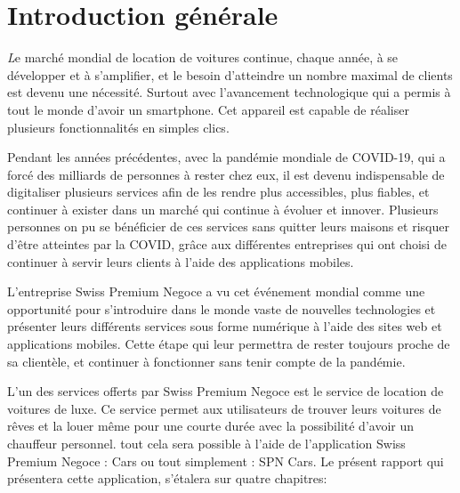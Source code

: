 \thispagestyle{plain}
\setcounter{page}{1}
\chapter*{Introduction générale}
\vspace{1cm}
\setlength{\parindent}{40pt}
\justifying
\begin{small}
    \lettrine[findent=2pt,lines=3]{\textit{L}}{}e marché mondial de location de voitures continue, chaque année, à se développer et à s'amplifier, et le besoin d'atteindre un nombre maximal de clients est devenu une nécessité. Surtout avec l'avancement technologique qui a permis à tout le monde d'avoir un smartphone. Cet appareil est capable de réaliser plusieurs fonctionnalités en simples clics.

    \noindent Pendant les années précédentes, avec la pandémie mondiale de COVID-19, qui a forcé des milliards de personnes à rester chez eux, il est devenu indispensable de digitaliser plusieurs services afin de les rendre plus accessibles, plus fiables, et continuer à exister dans un marché qui continue à évoluer et innover. Plusieurs personnes on pu se bénéficier de ces services sans quitter leurs maisons et risquer d'être atteintes par la COVID, grâce aux différentes entreprises qui ont choisi de continuer à servir leurs clients à l'aide des applications mobiles.

    \noindent L'entreprise Swiss Premium Negoce a vu cet événement mondial comme une opportunité pour s'introduire dans le monde vaste de nouvelles technologies et présenter leurs différents services sous forme numérique à l'aide des sites web et applications mobiles. Cette étape qui leur permettra de rester toujours proche de sa clientèle, et continuer à fonctionner sans tenir compte de la pandémie.

    \noindent L'un des services offerts par Swiss Premium Negoce est le service de location de voitures de luxe. Ce service permet aux utilisateurs de trouver leurs voitures de rêves et la louer même pour une courte durée avec la possibilité d'avoir un chauffeur personnel. tout cela sera possible à l'aide de l'application Swiss Premium Negoce : Cars ou tout simplement : SPN Cars. Le présent rapport qui présentera cette application, s'étalera sur quatre chapitres:


\end{small}
